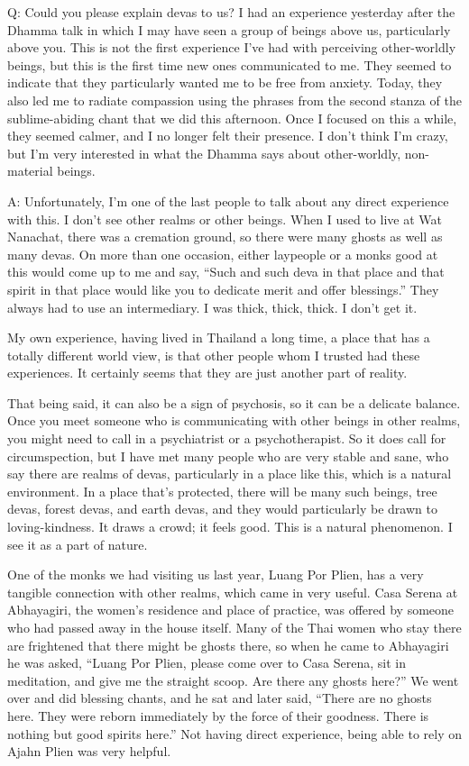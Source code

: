 \qaspace
Q: Could you please explain devas to us? I had an experience yesterday
after the Dhamma talk in which I may have seen a group of beings above
us, particularly above you. This is not the first experience I’ve had
with perceiving other-worldly beings, but this is the first time new
ones communicated to me. They seemed to indicate that they particularly
wanted me to be free from anxiety. Today, they also led me to radiate
compassion using the phrases from the second stanza of the
sublime-abiding chant that we did this afternoon. Once I focused on this
a while, they seemed calmer, and I no longer felt their presence. I
don’t think I’m crazy, but I’m very interested in what the Dhamma says
about other-worldly, non-material beings.

\qaspace
A: Unfortunately, I’m one of the last people to talk about any direct
experience with this. I don’t see other realms or other beings. When I
used to live at Wat Nanachat, there was a cremation ground, so there
were many ghosts as well as many devas. On more than one occasion,
either laypeople or a monks good at this would come up to me and say,
“Such and such deva in that place and that spirit in that place would
like you to dedicate merit and offer blessings.” They always had to use
an intermediary. I was thick, thick, thick. I don’t get it.

My own experience, having lived in Thailand a long time, a place that
has a totally different world view, is that other people whom I trusted
had these experiences. It certainly seems that they are just another
part of reality.

That being said, it can also be a sign of psychosis, so it can be a
delicate balance. Once you meet someone who is communicating with other
beings in other realms, you might need to call in a psychiatrist or a
psychotherapist. So it does call for circumspection, but I have met many
people who are very stable and sane, who say there are realms of devas,
particularly in a place like this, which is a natural environment. In a
place that’s protected, there will be many such beings, tree devas,
forest devas, and earth devas, and they would particularly be drawn to
loving-kindness. It draws a crowd; it feels good. This is a natural
phenomenon. I see it as a part of nature.

One of the monks we had visiting us last year, Luang Por Plien, has a
very tangible connection with other realms, which came in very useful.
Casa Serena at Abhayagiri, the women’s residence and place of practice,
was offered by someone who had passed away in the house itself. Many of
the Thai women who stay there are frightened that there might be ghosts
there, so when he came to Abhayagiri he was asked, “Luang Por Plien,
please come over to Casa Serena, sit in meditation, and give me the
straight scoop. Are there any ghosts here?” We went over and did
blessing chants, and he sat and later said, “There are no ghosts here.
They were reborn immediately by the force of their goodness. There is
nothing but good spirits here.” Not having direct experience, being able
to rely on Ajahn Plien was very helpful.

